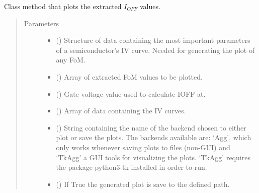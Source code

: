\documentclass[letterpaper,10pt,english,openany, oneside]{sphinxmanual}
\begin{document}
\begin{fulllineitems}
\begin{fulllineitems}
\label{\detokenize{index:fompy.fom.ioff_ext.plot}}
Class method that plots the extracted \(I_{OFF}\) values.
\begin{quote}\begin{description}
\item[{Parameters}] \leavevmode\begin{itemize}
\item {} 
 () \textendash{} Structure of data containing the most important parameters of a semiconductor’s IV curve.
Needed for generating the plot of any FoM.

\item {} 
 () \textendash{} Array of extracted FoM values to be plotted.

\item {} 
 () \textendash{} Gate voltage value used to calculate IOFF at.

\item {} 
 () \textendash{} Array of data containing the IV curves.

\item {} 
 () \textendash{} String containing the name of the backend chosen to either plot or save the plots. The backends available are:
‘Agg’, which only works whenever saving plots to files (non-GUI) and ‘TkAgg’ a GUI tools for visualizing the plots.
‘TkAgg’ requires the package python3-tk installed in order to run.

\item {} 
 () \textendash{} If True the generated plot is save to the defined path.

\end{itemize}


\end{description}
\end{quote}
\end{fulllineitems}
\end{fulllineitems}
\end{document}

